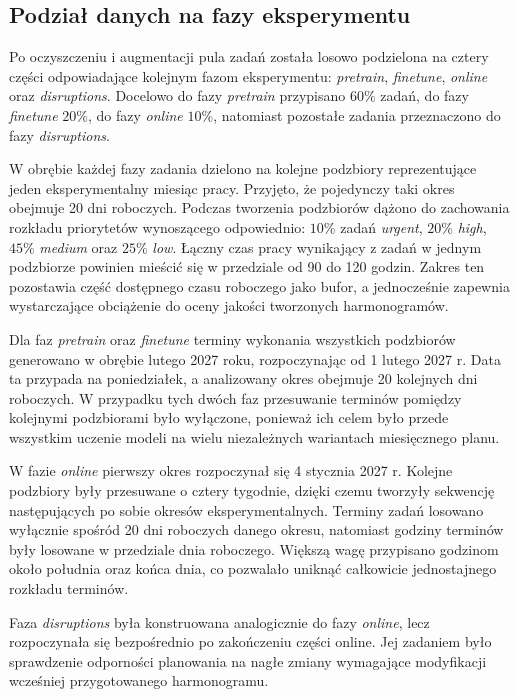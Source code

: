 \subsection{Podział danych na fazy eksperymentu}

Po oczyszczeniu i augmentacji pula zadań została losowo podzielona na cztery części odpowiadające kolejnym fazom eksperymentu: \textit{pretrain}, \textit{finetune}, \textit{online} oraz \textit{disruptions}. Docelowo do fazy \textit{pretrain} przypisano $60\%$ zadań, do fazy \textit{finetune} $20\%$, do fazy \textit{online} $10\%$, natomiast pozostałe zadania przeznaczono do fazy \textit{disruptions}.

W obrębie każdej fazy zadania dzielono na kolejne podzbiory reprezentujące jeden eksperymentalny miesiąc pracy. Przyjęto, że pojedynczy taki okres obejmuje 20 dni roboczych. Podczas tworzenia podzbiorów dążono do zachowania rozkładu priorytetów wynoszącego odpowiednio: $10\%$ zadań \textit{urgent}, $20\%$ \textit{high}, $45\%$ \textit{medium} oraz $25\%$ \textit{low}. Łączny czas pracy wynikający z zadań w jednym podzbiorze powinien mieścić się w przedziale od 90 do 120 godzin. Zakres ten pozostawia część dostępnego czasu roboczego jako bufor, a jednocześnie zapewnia wystarczające obciążenie do oceny jakości tworzonych harmonogramów.

Dla faz \textit{pretrain} oraz \textit{finetune} terminy wykonania wszystkich podzbiorów generowano w obrębie lutego 2027 roku, rozpoczynając od 1 lutego 2027 r. Data ta przypada na poniedziałek, a analizowany okres obejmuje 20 kolejnych dni roboczych. W przypadku tych dwóch faz przesuwanie terminów pomiędzy kolejnymi podzbiorami było wyłączone, ponieważ ich celem było przede wszystkim uczenie modeli na wielu niezależnych wariantach miesięcznego planu.

W fazie \textit{online} pierwszy okres rozpoczynał się 4 stycznia 2027 r. Kolejne podzbiory były przesuwane o cztery tygodnie, dzięki czemu tworzyły sekwencję następujących po sobie okresów eksperymentalnych. Terminy zadań losowano wyłącznie spośród 20 dni roboczych danego okresu, natomiast godziny terminów były losowane w przedziale dnia roboczego. Większą wagę przypisano godzinom około południa oraz końca dnia, co pozwalało uniknąć całkowicie jednostajnego rozkładu terminów.

Faza \textit{disruptions} była konstruowana analogicznie do fazy \textit{online}, lecz rozpoczynała się bezpośrednio po zakończeniu części online. Jej zadaniem było sprawdzenie odporności planowania na nagłe zmiany wymagające modyfikacji wcześniej przygotowanego harmonogramu.

